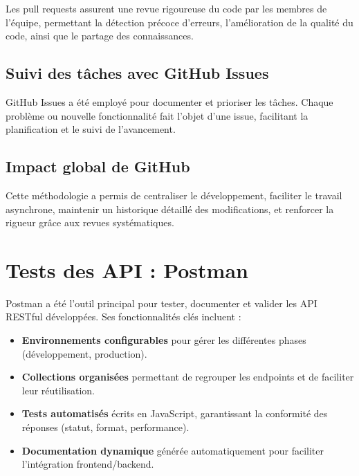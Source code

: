 \documentclass{rapportPfe}
\begin{document}
Les pull requests assurent une revue rigoureuse du code par les membres de l’équipe, permettant la détection précoce d’erreurs, l’amélioration de la qualité du code, ainsi que le partage des connaissances.

\subsection{Suivi des tâches avec GitHub Issues}

GitHub Issues a été employé pour documenter et prioriser les tâches. Chaque problème ou nouvelle fonctionnalité fait l’objet d’une issue, facilitant la planification et le suivi de l’avancement.

\subsection{Impact global de GitHub}

Cette méthodologie a permis de centraliser le développement, faciliter le travail asynchrone, maintenir un historique détaillé des modifications, et renforcer la rigueur grâce aux revues systématiques.

\section{Tests des API : Postman}

Postman a été l’outil principal pour tester, documenter et valider les API RESTful développées. Ses fonctionnalités clés incluent :

\begin{itemize}
    \item \textbf{Environnements configurables} pour gérer les différentes phases (développement, production).
    \item \textbf{Collections organisées} permettant de regrouper les endpoints et de faciliter leur réutilisation.
    \item \textbf{Tests automatisés} écrits en JavaScript, garantissant la conformité des réponses (statut, format, performance).
    \item \textbf{Documentation dynamique} générée automatiquement pour faciliter l’intégration frontend/backend.
\end{itemize}
\end{document}
